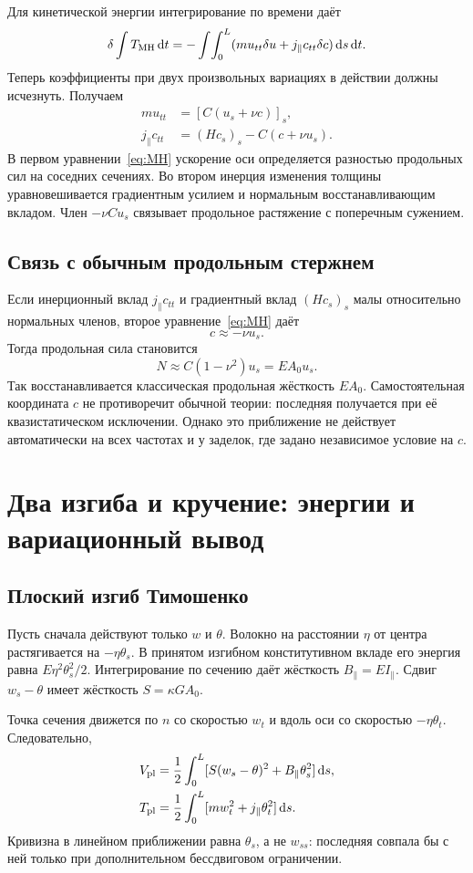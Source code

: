 \documentclass[11pt,a4paper]{article}
\newcommand{\dd}{\,\mathrm d}
\begin{document}
Для кинетической энергии интегрирование по времени даёт
\[
\delta\int T_{\rm MH}\dd t
=-\int\!\int_0^L(mu_{tt}\delta u+j_\parallel c_{tt}\delta c)\dd s\dd t.
\]
Теперь коэффициенты при двух произвольных вариациях в действии должны исчезнуть. Получаем
\begin{equation}
\boxed{\begin{aligned}
mu_{tt}&=[C(u_s+\nu c)]_s,\\
j_\parallel c_{tt}&=(Hc_s)_s-C(c+\nu u_s).
\end{aligned}}
\label{eq:MH}
\end{equation}
В первом уравнении~\eqref{eq:MH} ускорение оси определяется разностью продольных сил на соседних сечениях. Во втором инерция изменения толщины уравновешивается градиентным усилием и нормальным восстанавливающим вкладом. Член $-\nu C u_s$ связывает продольное растяжение с поперечным сужением.

\subsection{Связь с обычным продольным стержнем}
Если инерционный вклад $j_\parallel c_{tt}$ и градиентный вклад $(Hc_s)_s$ малы относительно нормальных членов, второе уравнение~\eqref{eq:MH} даёт
\[
c\approx-\nu u_s.
\]
Тогда продольная сила становится
\[
N\approx C(1-\nu^2)u_s=EA_0u_s.
\]
Так восстанавливается классическая продольная жёсткость $EA_0$. Самостоятельная координата $c$ не противоречит обычной теории: последняя получается при её квазистатическом исключении. Однако это приближение не действует автоматически на всех частотах и у заделок, где задано независимое условие на $c$.

\section{Два изгиба и кручение: энергии и вариационный вывод}
\subsection{Плоский изгиб Тимошенко}
Пусть сначала действуют только $w$ и $\theta$. Волокно на расстоянии $\eta$ от центра растягивается на $-\eta\theta_s$. В принятом изгибном конститутивном вкладе его энергия равна $E\eta^2\theta_s^2/2$. Интегрирование по сечению даёт жёсткость $B_\parallel=EI_\parallel$. Сдвиг $w_s-\theta$ имеет жёсткость $S=\kappa GA_0$.

Точка сечения движется по $n$ со скоростью $w_t$ и вдоль оси со скоростью $-\eta\theta_t$. Следовательно,
\[
\begin{aligned}
V_{\rm pl}&=\frac12\int_0^L[S(w_s-\theta)^2+B_\parallel\theta_s^2]\dd s,\\
T_{\rm pl}&=\frac12\int_0^L[mw_t^2+j_\parallel\theta_t^2]\dd s.
\end{aligned}
\]
Кривизна в линейном приближении равна $\theta_s$, а не $w_{ss}$: последняя совпала бы с ней только при дополнительном бессдвиговом ограничении.
\end{document}
